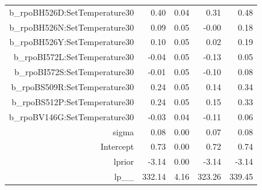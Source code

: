 \begin{table}[ht]
\begin{tabular}{rrrrr}
  b\_rpoBH526D:SetTemperature30 & 0.40 & 0.04 & 0.31 & 0.48 \\ 
  b\_rpoBH526N:SetTemperature30 & 0.09 & 0.05 & -0.00 & 0.18 \\ 
  b\_rpoBH526Y:SetTemperature30 & 0.10 & 0.05 & 0.02 & 0.19 \\ 
  b\_rpoBI572L:SetTemperature30 & -0.04 & 0.05 & -0.13 & 0.05 \\ 
  b\_rpoBI572S:SetTemperature30 & -0.01 & 0.05 & -0.10 & 0.08 \\ 
  b\_rpoBS509R:SetTemperature30 & 0.24 & 0.05 & 0.14 & 0.34 \\ 
  b\_rpoBS512P:SetTemperature30 & 0.24 & 0.05 & 0.15 & 0.33 \\ 
  b\_rpoBV146G:SetTemperature30 & -0.03 & 0.04 & -0.11 & 0.06 \\ 
  sigma & 0.08 & 0.00 & 0.07 & 0.08 \\ 
  Intercept & 0.73 & 0.00 & 0.72 & 0.74 \\ 
  lprior & -3.14 & 0.00 & -3.14 & -3.14 \\ 
  lp\_\_ & 332.14 & 4.16 & 323.26 & 339.45 \\ 
   \hline
\end{tabular}
\end{table}
